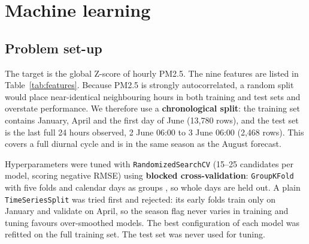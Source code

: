 \documentclass[11pt,a4paper]{article}
\begin{document}
\section{Machine learning}
\subsection{Problem set-up}
The target is the global Z-score of hourly PM2.5. The nine features are listed in Table~\ref{tab:features}. Because PM2.5 is strongly autocorrelated, a random split would place near-identical neighbouring hours in both training and test sets and overstate performance. We therefore use a \textbf{chronological split}: the training set contains January, April and the first day of June (13{,}780 rows), and the test set is the last full 24 hours observed, 2 June 06:00 to 3 June 06:00 (2{,}468 rows). This covers a full diurnal cycle and is in the same season as the August forecast.

Hyperparameters were tuned with \texttt{RandomizedSearchCV} (15--25 candidates per model, scoring negative RMSE) using \textbf{blocked cross-validation}: \texttt{GroupKFold} with five folds and calendar days as groups \cite{roberts2017}, so whole days are held out. A plain \texttt{TimeSeriesSplit} was tried first and rejected: its early folds train only on January and validate on April, so the season flag never varies in training and tuning favours over-smoothed models. The best configuration of each model was refitted on the full training set. The test set was never used for tuning.
\end{document}

